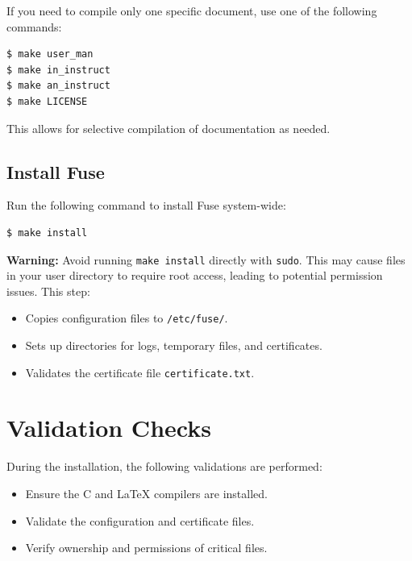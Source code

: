 \documentclass[a4paper,12pt]{article}
\begin{document}
\newpage

If you need to compile only one specific document, use one of the following commands:
\begin{lstlisting}[language=bash]
$ make user_man
$ make in_instruct
$ make an_instruct
$ make LICENSE
\end{lstlisting}
This allows for selective compilation of documentation as needed.

\subsection{Install Fuse}
Run the following command to install Fuse system-wide:
\begin{lstlisting}[language=bash]
$ make install
\end{lstlisting}
\textbf{Warning:} Avoid running \texttt{make install} directly with \texttt{sudo}. This may cause files in your user directory to require root access, leading to potential permission issues.
\newline
This step:
\begin{itemize}
	\item Copies configuration files to \texttt{/etc/fuse/}.
	\item Sets up directories for logs, temporary files, and certificates.
	\item Validates the certificate file \texttt{certificate.txt}.
\end{itemize}

\section{Validation Checks}
During the installation, the following validations are performed:
\begin{itemize}
	\item Ensure the C and LaTeX compilers are installed.
	\item Validate the configuration and certificate files.
	\item Verify ownership and permissions of critical files.
\end{itemize}

\newpage
\end{document}
